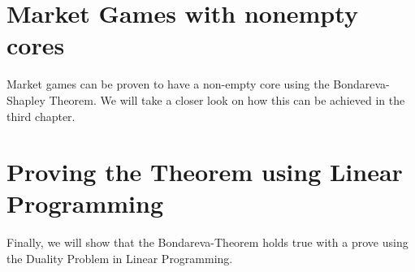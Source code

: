 \documentclass[10pt,a4paper,titlepage]{article}
\theoremstyle{plain}
\theoremstyle{definition}
\begin{document}
\section{Market Games with nonempty cores}
Market games can be proven to have a non-empty core using the Bondareva-Shapley Theorem. We will take a closer look on how this can be achieved in the third chapter.

\section{Proving the Theorem using Linear Programming}
Finally, we will show that the Bondareva-Theorem holds true with a prove using the Duality Problem in Linear Programming.
 
\pagebreak
 
\printbibliography
\end{document}

